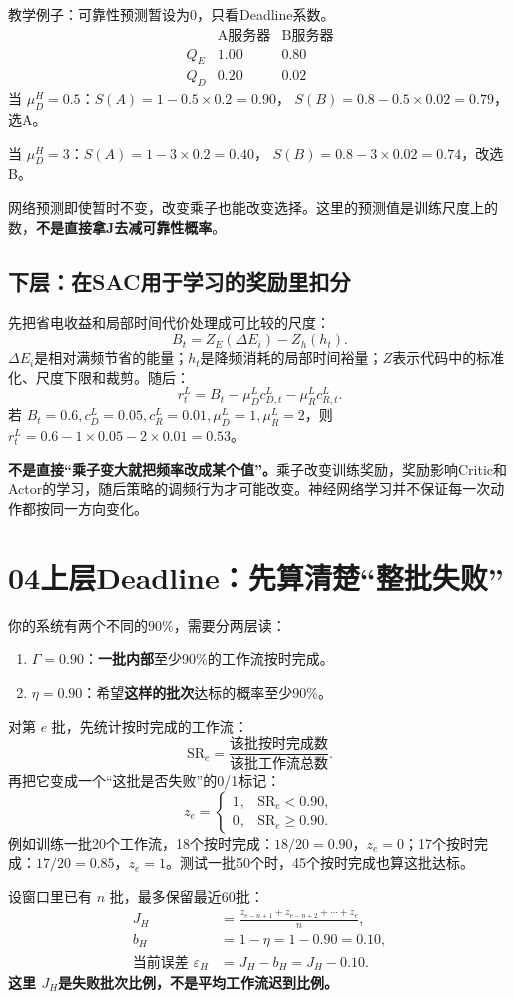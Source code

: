 \documentclass[UTF8,11pt,a4paper,fontset=fandol]{ctexart}
\newcommand{\lesson}[2]{\section*{#1\quad #2}}
\begin{document}
\begin{examplebox}
教学例子：可靠性预测暂设为0，只看Deadline系数。
\[
\begin{array}{c|cc}
&\text{A服务器}&\text{B服务器}\\\hline
Q_E&1.00&0.80\\
Q_D&0.20&0.02
\end{array}
\]
当 $\mu_D^H=0.5$：$S(A)=1-0.5\times0.2=0.90$，
$S(B)=0.8-0.5\times0.02=0.79$，选A。

当 $\mu_D^H=3$：$S(A)=1-3\times0.2=0.40$，
$S(B)=0.8-3\times0.02=0.74$，改选B。
\end{examplebox}
网络预测即使暂时不变，改变乘子也能改变选择。这里的预测值是训练尺度上的数，\textbf{不是直接拿J去减可靠性概率}。

\subsection*{下层：在SAC用于学习的奖励里扣分}
先把省电收益和局部时间代价处理成可比较的尺度：
\[
B_t=Z_E(\Delta E_i)-Z_h(h_t).
\]
$\Delta E_i$是相对满频节省的能量；$h_t$是降频消耗的局部时间裕量；$Z$表示代码中的标准化、尺度下限和裁剪。随后：
\[
r_t^L=B_t-\mu_D^L c_{D,t}^L-\mu_R^L c_{R,t}^L.
\]
若 $B_t=0.6,c_D^L=0.05,c_R^L=0.01,\mu_D^L=1,\mu_R^L=2$，则
$r_t^L=0.6-1\times0.05-2\times0.01=0.53$。

\textbf{不是直接“乘子变大就把频率改成某个值”。}乘子改变训练奖励，奖励影响Critic和Actor的学习，随后策略的调频行为才可能改变。神经网络学习并不保证每一次动作都按同一方向变化。

\newpage
\lesson{04}{上层Deadline：先算清楚“整批失败”}
你的系统有两个不同的90\%，需要分两层读：
\begin{enumerate}
\item $\Gamma=0.90$：\textbf{一批内部}至少90\%的工作流按时完成。
\item $\eta=0.90$：希望\textbf{这样的批次}达标的概率至少90\%。
\end{enumerate}
对第 $e$ 批，先统计按时完成的工作流：
\[
\mathrm{SR}_e=\frac{\text{该批按时完成数}}{\text{该批工作流总数}}.
\]
再把它变成一个“这批是否失败”的0/1标记：
\[
z_e=\begin{cases}
1,&\mathrm{SR}_e<0.90,\\
0,&\mathrm{SR}_e\ge0.90.
\end{cases}
\]
例如训练一批20个工作流，18个按时完成：$18/20=0.90$，$z_e=0$；17个按时完成：$17/20=0.85$，$z_e=1$。测试一批50个时，45个按时完成也算这批达标。

设窗口里已有 $n$ 批，最多保留最近60批：
\begin{align*}
J_H &=\frac{z_{e-n+1}+z_{e-n+2}+\cdots+z_e}{n},\\
b_H&=1-\eta=1-0.90=0.10,\\
\text{当前误差 }\varepsilon_H&=J_H-b_H=J_H-0.10.
\end{align*}
\textbf{这里 $J_H$是失败批次比例，不是平均工作流迟到比例。}
\end{document}
